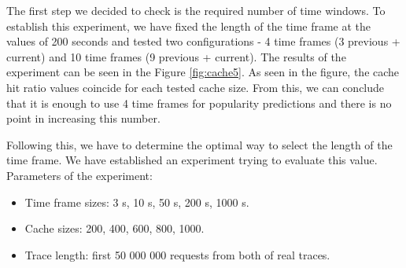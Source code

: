 The first step we decided to check is the required number of time windows. To establish this experiment, we have fixed the length of the time frame at the values of 200 seconds and tested two configurations - 4 time frames (3 previous + current) and 10 time frames (9 previous + current). The results of the experiment can be seen in the Figure \ref{fig:cache5}. As seen in the figure, the cache hit ratio values coincide for each tested cache size. From this, we can conclude that it is enough to use 4 time frames for popularity predictions and there is no point in increasing this number.


Following this, we have to determine the optimal way to select the length of the time frame. We have established an experiment trying to evaluate this value. Parameters of the experiment:

\begin{itemize}
	\item Time frame sizes: 3 s, 10 s, 50 s, 200 s, 1000 s.
	\item Cache sizes: 200, 400, 600, 800, 1000.
	\item Trace length: first 50 000 000 requests from both of real traces.
\end{itemize}

